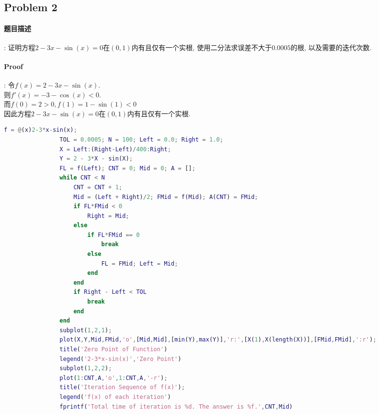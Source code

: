 \documentclass{article}
\begin{document}
\begin{CJK*}{UTF8}{song}
		\subsection{Problem 2}
			\paragraph{题目描述}
			:\newline
				证明方程$2-3x-\sin\left(x\right) = 0$在$\left(0,1\right)$内有且仅有一个实根, 使用二分法求误差不大于$0.0005$的根, 以及需要的迭代次数.
			\paragraph{Proof}
			:\newline
				令$f\left(x\right) = 2 - 3x - \sin\left(x\right)$.\\
				则$f'\left(x\right) = -3 - \cos \left(x\right) < 0$.\\
				而$f\left(0\right) = 2 > 0, f\left(1\right) = 1 - \sin\left(1\right) < 0$\\
				因此方程$2-3x-\sin\left(x\right) = 0$在$\left(0,1\right)$内有且仅有一个实根.
				
			\begin{lstlisting}[language=Matlab]
				f = @(x)2-3*x-sin(x);
				TOL = 0.0005; N = 100; Left = 0.0; Right = 1.0;
				X = Left:(Right-Left)/400:Right;
				Y = 2 - 3*X - sin(X);
				FL = f(Left); CNT = 0; Mid = 0; A = [];
				while CNT < N
					CNT = CNT + 1;
					Mid = (Left + Right)/2; FMid = f(Mid); A(CNT) = FMid;
					if FL*FMid < 0
						Right = Mid;
					else
						if FL*FMid == 0
							break
						else
							FL = FMid; Left = Mid;
						end
					end
					if Right - Left < TOL
						break
					end
				end
				subplot(1,2,1);
				plot(X,Y,Mid,FMid,'o',[Mid,Mid],[min(Y),max(Y)],'r:',[X(1),X(length(X))],[FMid,FMid],':r');
				title('Zero Point of Function')
				legend('2-3*x-sin(x)','Zero Point')
				subplot(1,2,2);
				plot(1:CNT,A,'o',1:CNT,A,'-r');
				title('Iteration Sequence of f(x)');
				legend('f(x) of each iteration')
				fprintf('Total time of iteration is %d. The answer is %f.',CNT,Mid)
			\end{lstlisting}
			

\end{CJK*}
\end{document}
